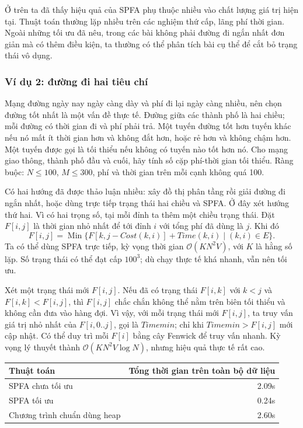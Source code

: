 \documentclass[11pt]{article}
\newcommand{\Oh}{\mathcal{O}}
\newcommand{\Min}{\operatorname{Min}}
\begin{document}
Ở trên ta đã thấy hiệu quả của SPFA phụ thuộc nhiều vào chất lượng giá trị
hiện tại. Thuật toán thường lặp nhiều trên các nghiệm thứ cấp, lãng phí thời
gian. Ngoài những tối ưu đã nêu, trong các bài không phải đường đi ngắn nhất
đơn giản mà có thêm điều kiện, ta thường có thể phân tích bài cụ thể để cắt
bỏ trạng thái vô dụng.

\subsubsection*{Ví dụ 2: đường đi hai tiêu chí}

Mạng đường ngày nay ngày càng dày và phí đi lại ngày càng nhiều, nên chọn
đường tốt nhất là một vấn đề thực tế. Đường giữa các thành phố là hai chiều;
mỗi đường có thời gian đi và phí phải trả. Một tuyến đường tốt hơn tuyến khác
nếu nó mất ít thời gian hơn và không đắt hơn, hoặc rẻ hơn và không chậm hơn.
Một tuyến được gọi là tối thiểu nếu không có tuyến nào tốt hơn nó. Cho mạng
giao thông, thành phố đầu và cuối, hãy tính số cặp phí-thời gian tối thiểu.
Ràng buộc: \(N\le 100\), \(M\le 300\), phí và thời gian trên mỗi cạnh không
quá 100.

Có hai hướng đã được thảo luận nhiều: xây đồ thị phân tầng rồi giải đường đi
ngắn nhất, hoặc dùng trực tiếp trạng thái hai chiều và SPFA. Ở đây xét hướng
thứ hai. Vì có hai trọng số, tại mỗi đỉnh ta thêm một chiều trạng thái. Đặt
\(F[i,j]\) là thời gian nhỏ nhất để tới đỉnh \(i\) với tổng phí đã dùng là
\(j\). Khi đó
\[
  F[i,j]=
  \Min\{F[k,j-\mathit{Cost}(k,i)]+\mathit{Time}(k,i)\mid (k,i)\in E\}.
\]
Ta có thể dùng SPFA trực tiếp, kỳ vọng thời gian
\(\Oh(KN^2V)\), với \(K\) là hằng số lặp. Số trạng thái có thể đạt cấp
\(100^3\); dù chạy thực tế khá nhanh, vẫn nên tối ưu.

Xét một trạng thái mới \(F[i,j]\). Nếu đã có trạng thái \(F[i,k]\) với
\(k<j\) và \(F[i,k]<F[i,j]\), thì \(F[i,j]\) chắc chắn không thể nằm trên
biên tối thiểu và không cần đưa vào hàng đợi. Vì vậy, với mỗi trạng thái mới
\(F[i,j]\), ta truy vấn giá trị nhỏ nhất của \(F[i,0..j]\), gọi là
\(\mathit{Timemin}\); chỉ khi \(\mathit{Timemin}>F[i,j]\) mới cập nhật. Có
thể duy trì mỗi \(F[i]\) bằng cây Fenwick để truy vấn nhanh. Kỳ vọng lý thuyết
thành \(\Oh(KN^2V\log N)\), nhưng hiệu quả thực tế rất cao.

\begin{center}
\begin{tabular}{|l|r|}
\hline
Thuật toán & Tổng thời gian trên toàn bộ dữ liệu \\
\hline
SPFA chưa tối ưu & 2.09s \\
SPFA tối ưu & 0.24s \\
Chương trình chuẩn dùng heap & 2.60s \\
\hline
\end{tabular}
\end{center}
\end{document}
